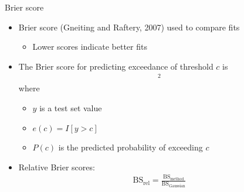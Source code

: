 \documentclass{beamer}
\begin{document}
\begin{frame}{Brier score}
  \begin{itemize} \setlength{\itemsep}{1em}
    \item Brier score (Gneiting and Raftery, 2007) used to compare fits
    \begin{itemize} \setlength{\itemsep}{0.5em}
      \item Lower scores indicate better fits
    \end{itemize}
    \item The Brier score for predicting exceedance of threshold $c$ is
    \begin{align*}
      [e(c) - P(c)]^2
    \end{align*}
    where \vspace{0.25em}
    \begin{itemize} \setlength{\itemsep}{0.25em}
      \item $y$ is a test set value
      \item $e(c) = I[y > c]$
      \item $P(c)$ is the predicted probability of exceeding $c$
    \end{itemize}
    \item Relative Brier scores:
    \begin{align*}
      \text{BS}_\text{rel} = \frac{ \text{BS}_\text{method}}{ \text{BS}_\text{Gaussian}}
    \end{align*}
  \end{itemize}
\end{frame}
\end{document}
